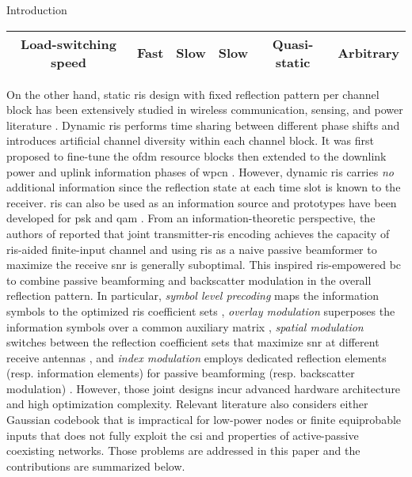 \documentclass[journal]{IEEEtran}
\begin{document}
\begin{section}{Introduction}
\begin{table*}[!t]
\begin{tabularx}{\textwidth}{CCCCCC}
			Load-switching speed                   & Fast                                    & Slow                        & Slow                                                                & Quasi-static        & Arbitrary                                                          \\ \bottomrule
		\end{tabularx}
	\end{table*}

	On the other hand, static \gls{ris} design with fixed reflection pattern per channel block has been extensively studied in wireless communication, sensing, and power literature \cite{Wu2018,Zhang2019a,Lin2022,Liu2022,Feng2022,Zhao2022}.
	Dynamic \gls{ris} performs time sharing between different phase shifts and introduces artificial channel diversity within each channel block.
	It was first proposed to fine-tune the \gls{ofdm} resource blocks \cite{Yang2020} then extended to the downlink power and uplink information phases of \gls{wpcn} \cite{Wu2021,Wu2021d,Hua2022a}.
	However, dynamic \gls{ris} carries \emph{no} additional information since the reflection state at each time slot is known to the receiver.
	\gls{ris} can also be used as an information source and prototypes have been developed for \gls{psk} \cite{Tang2019a} and \gls{qam} \cite{Dai2020a}.
	From an information-theoretic perspective, the authors of \cite{Karasik2020} reported that joint transmitter-\gls{ris} encoding achieves the capacity of \gls{ris}-aided finite-input channel and using \gls{ris} as a naive passive beamformer to maximize the receive \gls{snr} is generally suboptimal.
	This inspired \gls{ris}-empowered \gls{bc} \cite{Liu2019d,Bereyhi2020,Xu2020b,Zhang2021d,Hu2021b,Hua2022,Basar2020,Ma2020a,Yuan2021,Hu2021a} to combine passive beamforming and backscatter modulation in the overall reflection pattern.
	In particular, \emph{symbol level precoding} maps the information symbols to the optimized \gls{ris} coefficient sets \cite{Liu2019d,Bereyhi2020}, \emph{overlay modulation} superposes the information symbols over a common auxiliary matrix \cite{Xu2020b,Zhang2021d,Hu2021b,Hua2022}, \emph{spatial modulation} switches between the reflection coefficient sets that maximize \gls{snr} at different receive antennas \cite{Basar2020,Ma2020a,Yuan2021}, and \emph{index modulation} employs dedicated reflection elements (resp. information elements) for passive beamforming (resp. backscatter modulation) \cite{Hu2021a}.
	However, those joint designs incur advanced hardware architecture and high optimization complexity.
	Relevant literature also considers either Gaussian codebook \cite{Guo2019b,Ding2020,Long2020a,Zhou2019a,Wu2021a,Xu2021a,Yang2021a,Hu2021b} that is impractical for low-power nodes or finite equiprobable inputs \cite{Yang2018,Liang2020,Han2021,Zhang2022,Liu2019d,Bereyhi2020,Xu2020b,Zhang2021d,Hua2022,Basar2020,Ma2020a,Yuan2021,Hu2021a} that does not fully exploit the \gls{csi} and properties of active-passive coexisting networks.
	Those problems are addressed in this paper and the contributions are summarized below.


\end{section}
\end{document}
